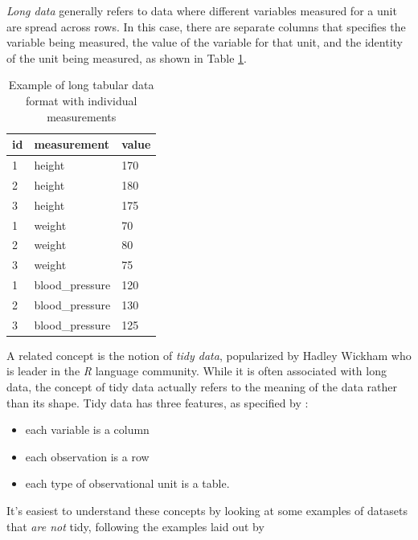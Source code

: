 \bigskip

\textit{Long data} generally refers to data where different variables measured for a unit are spread across rows.  In this case, there are separate columns that specifies the variable being measured, the value of the variable for that unit, and the identity of the unit being measured, as shown in Table \ref{long-data-table}.

\bigskip\noindent
\begin{table}[!htbp]
\centering
\begin{tabular}{p{}p{}p{}}
\toprule
id & measurement & value \\
\hline
1 & height & 170 \\
2 & height & 180 \\
3 & height & 175 \\
1 & weight & 70 \\
2 & weight & 80 \\
3 & weight & 75 \\
1 & blood\_pressure & 120 \\
2 & blood\_pressure & 130 \\
3 & blood\_pressure & 125 \\
\bottomrule
\end{tabular}
\caption{Example of long tabular data format with individual measurements}
\label{long-data-table}
\end{table}

\bigskip

\bigskip

A related concept is the notion of \textit{tidy data}, popularized by Hadley Wickham who is leader in the \textit{R} language community.  While it is often associated with long data, the concept of tidy data actually refers to the meaning of the data rather than its shape.  Tidy data has three features, as specified by \citep{Wickham:2014aa}:

\begin{itemize}
\item each variable is a column
\item each observation is a row
\item each type of observational unit is a table.
\end{itemize}

It's easiest to understand these concepts by looking at some examples of datasets that \textit{are not} tidy, following the examples laid out by \citep{Wickham:2014aa}

